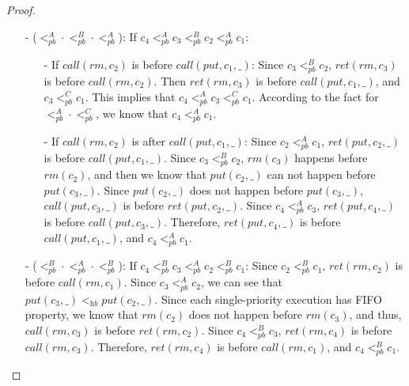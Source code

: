 \begin {proof}
\begin{itemize}
\item[-]  ($<_{\textit{pb}}^A \cdot <_{\textit{pb}}^B \cdot <_{\textit{pb}}^A$): If $c_4 <_{\textit{pb}}^A c_3 <_{\textit{pb}}^B c_2 <_{\textit{pb}}^A c_1$:
    \begin{itemize}
    \setlength{\itemsep}{0.5pt}
    \item[-] If $\textit{call}(\textit{rm},c_2)$ is before $\textit{call}(\textit{put},c_1,\_)$: Since $c_3 <_{\textit{pb}}^B c_2$, $\textit{ret}(\textit{rm},c_3)$ is before $\textit{call}(\textit{rm},c_2)$. Then $\textit{ret}(\textit{rm},c_3)$ is before $\textit{call}(\textit{put},c_1,\_)$, and $c_3 <_{\textit{pb}}^C c_1$. This implies that $c_4 <_{\textit{pb}}^A c_3 <_{\textit{pb}}^C c_1$. According to the fact for $<_{\textit{pb}}^A \cdot <_{\textit{pb}}^C$, we know that $c_4  <_{\textit{pb}}^A c_1$.

    \item[-] If $\textit{call}(\textit{rm},c_2)$ is after $\textit{call}(\textit{put},c_1,\_)$: Since $c_2 <_{\textit{pb}}^A c_1$, $\textit{ret}(\textit{put},c_2,\_)$ is before $\textit{call}(\textit{put},c_1,\_)$. Since $c_3 <_{\textit{pb}}^B c_2$, $\textit{rm}(c_3)$ happens before $\textit{rm}(c_2)$, and then we know that $\textit{put}(c_2,\_)$ can not happen before $\textit{put}(c_3,\_)$. Since $\textit{put}(c_2,\_)$ does not happen before $\textit{put}(c_3,\_)$, $\textit{call}(\textit{put},c_3,\_)$ is before $\textit{ret}(\textit{put},c_2,\_)$. Since $c_4 <_{\textit{pb}}^A c_3$, $\textit{ret}(\textit{put},c_4,\_)$ is before $\textit{call}(\textit{put},c_3,\_)$. Therefore, $\textit{ret}(\textit{put},c_4,\_)$ is before $\textit{call}(\textit{put},c_1,\_)$, and $c_4 <_{\textit{pb}}^A c_1$.
    \end{itemize}

\item[-]  ($<_{\textit{pb}}^B \cdot <_{\textit{pb}}^A \cdot <_{\textit{pb}}^B$): If $c_4 <_{\textit{pb}}^B c_3 <_{\textit{pb}}^A c_2 <_{\textit{pb}}^B c_1$: Since $c_2 <_{\textit{pb}}^B c_1$, $\textit{ret}(\textit{rm},c_2)$ is before $\textit{call}(\textit{rm},c_1)$. Since $c_3 <_{\textit{pb}}^A c_2$, we can see that $\textit{put}(c_3,\_) <_{\textit{hb}} \textit{put}(c_2,\_)$. Since each single-priority execution has FIFO property, we know that $\textit{rm}(c_2)$ does not happen before $\textit{rm}(c_3)$, and thus, $\textit{call}(\textit{rm},c_3)$ is before $\textit{ret}(\textit{rm},c_2)$. Since $c_4 <_{\textit{pb}}^B c_3$, $\textit{ret}(\textit{rm},c_4)$ is before $\textit{call}(\textit{rm},c_3)$. Therefore, $\textit{ret}(\textit{rm},c_4)$ is before $\textit{call}(\textit{rm},c_1)$, and $c_4 <_{\textit{pb}}^B c_1$.


\end{itemize}
\end{proof}
